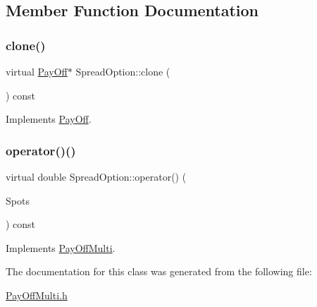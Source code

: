 \subsection{Member Function Documentation}
\hypertarget{classSpreadOption_a872a849b2671bf96ceda5adb7a938ce7}{}\label{classSpreadOption_a872a849b2671bf96ceda5adb7a938ce7} 
\subsubsection{\texorpdfstring{clone()}{clone()}}
{\footnotesize\ttfamily virtual \hyperlink{classPayOff}{Pay\+Off}$\ast$ Spread\+Option\+::clone (\begin{DoxyParamCaption}{ }\end{DoxyParamCaption}) const\hspace{0.3cm}{\ttfamily [virtual]}}



Implements \hyperlink{classPayOff_ad8194d5b82247ae89c25c515f0ba806a}{Pay\+Off}.

\hypertarget{classSpreadOption_ad374a8790abcf926a3a2be5fdc5676ca}{}\label{classSpreadOption_ad374a8790abcf926a3a2be5fdc5676ca} 
\subsubsection{\texorpdfstring{operator()()}{operator()()}}
{\footnotesize\ttfamily virtual double Spread\+Option\+::operator() (\begin{DoxyParamCaption}\item[{const \hyperlink{classMJArray}{M\+J\+Array} \&}]{Spots }\end{DoxyParamCaption}) const\hspace{0.3cm}{\ttfamily [virtual]}}



Implements \hyperlink{classPayOffMulti_a61039e0c0ee136842b5d6f340b9f8155}{Pay\+Off\+Multi}.



The documentation for this class was generated from the following file\+:\begin{DoxyCompactItemize}
\item 
\hyperlink{PayOffMulti_8h}{Pay\+Off\+Multi.\+h}\end{DoxyCompactItemize}
